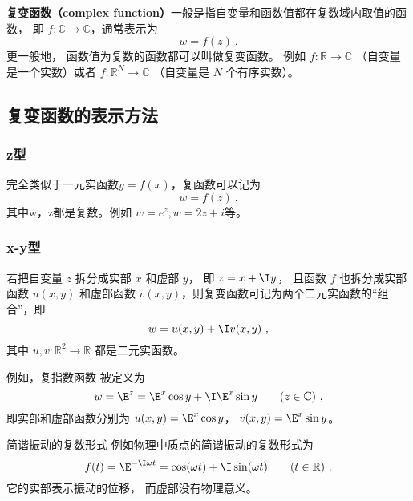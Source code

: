 
\begin{issues}
\issueTODO
\end{issues}

\textbf{复变函数（complex function）}一般是指自变量和函数值都在复数域内取值的函数， 即 $f:\mathbb C \to \mathbb C$，通常表示为
\begin{equation}
w = f(z)~.
\end{equation}
更一般地， 函数值为复数的函数都可以叫做复变函数。 例如 $f: \mathbb R \to \mathbb C$ （自变量是一个实数）或者 $f:\mathbb R^N \to \mathbb C$ （自变量是 $N$ 个有序实数）。

\subsection{复变函数的表示方法}
\subsubsection{z型}
完全类似于一元实函数$y=f(x)$，复函数可以记为
\begin{equation}
w = f(z)~.
\end{equation}
其中w，z都是复数。例如 $w=e^z, w=2z+i$等。

\subsubsection{x-y型}
若把自变量 $z$ 拆分成实部 $x$ 和虚部 $y$， 即 $z = x + \I y$， 且函数 $f$ 也拆分成实部函数 $u(x,y)$ 和虚部函数 $v(x,y)$，则复变函数可记为两个二元实函数的“组合”，即
\begin{equation}\label{eq_Cplx_1}
w = u(x,y) + \I v(x,y)~,
\end{equation}
其中 $u, v: \mathbb R^2 \to \mathbb R$ 都是二元实函数。 

例如，复指数函数 被定义为
\begin{equation}\label{eq_Cplx_3}
w = \E^z = \E^x \cos y + \I \E^x\sin y \qquad (z \in \mathbb C)~,
\end{equation}
即实部和虚部函数分别为 $u(x, y) = \E^x \cos y$， $v(x, y) = \E^x \sin y$。

\begin{example}{简谐振动的复数形式}
例如物理中质点的简谐振动的复数形式为
\begin{equation}
f(t) = \E^{-\I \omega t} = \cos(\omega t) + \I \sin(\omega t) \qquad (t \in \mathbb R)~.
\end{equation}
它的实部表示振动的位移， 而虚部没有物理意义。
\end{example}

